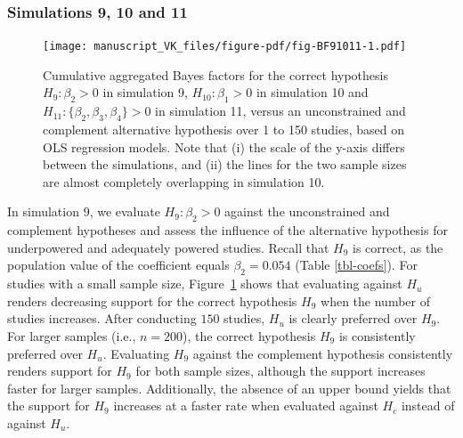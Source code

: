 \documentclass[
]{article}
\begin{document}
\hypertarget{simulations-9-10-and-11}{%
\subsubsection{Simulations 9, 10 and 11}\label{simulations-9-10-and-11}}

\begin{figure}[!h]

{\centering \texttt{[image: manuscript\_VK\_files/figure-pdf/fig-BF91011-1.pdf]}

}

\caption{\label{fig-BF91011}Cumulative aggregated Bayes factors for the
correct hypothesis \(H_9: \beta_2 > 0\) in simulation 9,
\(H_{10}: \beta_1 > 0\) in simulation 10 and
\(H_{11}: \{\beta_2, \beta_3, \beta_4\} > 0\) in simulation 11, versus
an unconstrained and complement alternative hypothesis over 1 to 150
studies, based on OLS regression models. Note that (i) the scale of the
y-axis differs between the simulations, and (ii) the lines for the two
sample sizes are almost completely overlapping in simulation 10.}

\end{figure}

In simulation 9, we evaluate \(H_9: \beta_2 > 0\) against the
unconstrained and complement hypotheses and assess the influence of the
alternative hypothesis for underpowered and adequately powered studies.
Recall that \(H_9\) is correct, as the population value of the
coefficient equals \(\beta_2 = 0.054\) (Table \ref{tbl-coefs}). For
studies with a small sample size, Figure~\ref{fig-BF91011} shows that
evaluating against \(H_u\) renders decreasing support for the correct
hypothesis \(H_9\) when the number of studies increases. After
conducting \(150\) studies, \(H_u\) is clearly preferred over \(H_9\).
For larger samples (i.e., \(n = 200\)), the correct hypothesis \(H_9\)
is consistently preferred over \(H_u\). Evaluating \(H_9\) against the
complement hypothesis consistently renders support for \(H_9\) for both
sample sizes, although the support increases faster for larger samples.
Additionally, the absence of an upper bound yields that the support for
\(H_9\) increases at a faster rate when evaluated against \(H_c\)
instead of against \(H_u\).
\end{document}
